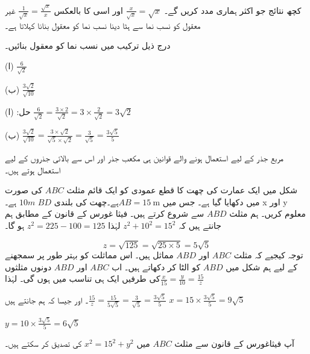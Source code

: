 کچھ نتائج جو اکثر ہماری مدد کریں گے۔
\(\frac{x}{\sqrt{x}}=\sqrt{x}\) اور اسی کا بالعکس \(\frac{1}{\sqrt{x}}=\frac{\sqrt{x}}{x}\)
غیر معقول کو نسب نما سے ہٹا دینا نسب نما کو معقول بنانا کہلاتا ہے۔

درج ذیل ترکیب میں نسب نما کو معقول بنائیں۔

(ا)
\(\frac{6}{\sqrt{2}}\)

(ب)
\(\frac{3\sqrt{2}}{\sqrt{10}}\)

حل:
(ا)
\(\frac{6}{\sqrt{2}}=\frac{3\times 2}{\sqrt{2}}=3\times\frac{2}{\sqrt{2}}=3\sqrt{2}\)

(ب)
\(\frac{3\sqrt{2}}{\sqrt{10}}=\frac{3\times\sqrt{2}}{\sqrt{5}\times\sqrt{2}}=\frac{3}{\sqrt{5}}=\frac{3\sqrt{5}}{5}\)

مربع جذر کے لیے استعمال ہونے والے قوانین ہی مکعب جذر اور اس سے بالائی جذروں کے لیے استعمال ہوتے ہیں۔

شکل  میں ایک عمارت کی چھت کا قطع عمودی کو ایک قائم مثلث \(ABC\) کی صورت میں دکھایا گیا ہے۔ جس میں
 \(AB=\SI{15}{\meter}\)ہے۔چھت کی بلندی
 \(BD\) \(10m\) ہے۔ x اور y  معلوم کریں۔
ہم مثلث \(ABD\) سے شروع کرتے ہیں۔ فیثا غورس کے قانون کے مطابق ہم جانتے ہیں کہ
 \(z^{2}+10^{2}=15^{2}\)
لہٰذا \(z^{2}=225-100=125\) ہو گا۔

\[z=\sqrt{125}=\sqrt{25\times 5}=5\sqrt{5}\]
توجہ کیجیے کہ مثلث \(ABC\) اور \(ABD\) مماثل ہیں۔ اس مماثلت کو بہتر طور پر سمجھنے کے لیے ہم  شکل   میں \(ABD\) کو الٹا کر دکھاتے ہیں۔ اب \(ABC\) اور \(ABD\) دونوں مثلثوں کی طرفیں ایک ہی تناسب میں ہوں گی۔ لہٰذا\(\frac{x}{15}=\frac{y}{10}=\frac{15}{z}\)

۔ اور جیسا کہ ہم جانتے ہیں\(\frac{15}{z}=\frac{15}{5\sqrt{5}}=\frac{3}{\sqrt{5}}=\frac{3\sqrt{5}}{5}\)
\(x=15\times\frac{3\sqrt{5}}{5}=9\sqrt{5}\)

\(y=10\times\frac{3\sqrt{5}}{5}=6\sqrt{5}\)

آپ فیثاغورس کے قانون سے مثلث  \(ABC\) میں \(x^{2}=15^{2}+y^{2}\) کی تصدیق کر سکتے ہیں۔

